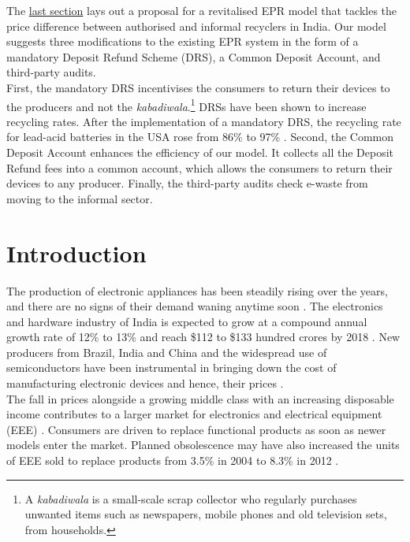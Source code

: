 \documentclass[a4paper, 12pt]{article}
\begin{document}
                    The \hyperref[sec:4]{last section} lays out a proposal for a revitalised EPR model that tackles the price difference between authorised and informal recyclers in India. Our model suggests three modifications to the existing EPR system in the form of a mandatory Deposit Refund Scheme (DRS), a Common Deposit Account, and third-party audits.\\
                    
                     First, the mandatory DRS incentivises the consumers to return their devices to the producers and not the \textit{kabadiwala}.\footnote{A \textit{kabadiwala} is a small-scale scrap collector who regularly purchases unwanted items such as newspapers, mobile phones and old television sets, from households.} DRSs have been shown to increase recycling rates. After the implementation of a mandatory DRS, the recycling rate for lead-acid batteries in the USA rose from 86\% to 97\% \parencite{wallspaper}. Second, the Common Deposit Account enhances the efficiency of our model. It collects all the Deposit Refund fees into a common account, which allows the consumers to return their devices to any producer. Finally, the third-party audits check e-waste from moving to the informal sector.\\
                    
                    \newpage
                    \section{Introduction}
                    The production of electronic appliances has been steadily rising over the years, and there are no signs of their demand waning anytime soon \parencite{chidambarampaper}. The electronics and hardware industry of India is expected to grow at a compound annual growth rate of 12\% to 13\% and reach \$112 to \$133 hundred crores by 2018 \parencite{assochameyreport}. New producers from Brazil, India and China and the widespread use of semiconductors have been instrumental in bringing down the cost of manufacturing electronic devices and hence, their prices \parencite{ahmednews}. \\
                    
                    The fall in prices alongside a growing middle class with an increasing disposable income contributes to a larger market for electronics and electrical equipment (EEE) \parencite{assochamnecreport}. Consumers are driven to replace functional products as soon as newer models enter the market. Planned obsolescence may have also increased the units of EEE sold to replace products from 3.5\% in 2004 to 8.3\% in 2012 \parencite{alanews}. \\
                   
\end{document}
